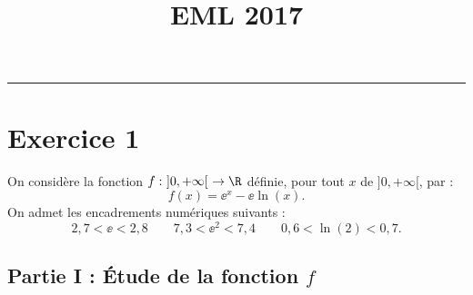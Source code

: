 \documentclass[11pt]{article}%
\title{\bf \vspace{-1.6cm} EML 2017} %
\author{} %
\date{} %
\begin{document}
\maketitle %
\vspace{-1.2cm}\hrule %
\thispagestyle{fancy}
 
\vspace*{.4cm}


\section*{Exercice 1}
\noindent
On considère la fonction $f : \ ]0,+\infty[ \ \rightarrow \R$ définie,
pour tout $x$ de $]0,+\infty[$, par :
\[
f(x)=\ee^x-\ee \ln(x).
\]
On admet les encadrements numériques suivants :
\[
2,7<\ee<2,8 \qquad 7,3<\ee^2<7,4 \qquad 0,6<\ln(2)<0,7.
\]

\subsection*{Partie I : Étude de la fonction $f$}
\end{document}
